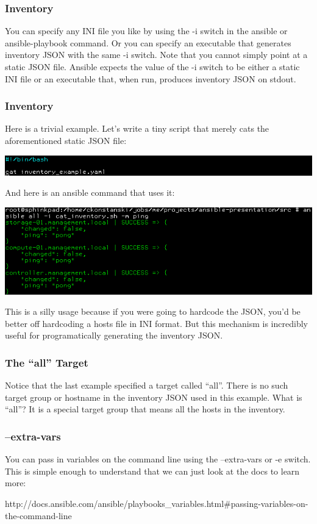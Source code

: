 \documentclass[helvetica,english,utf8,notitle,nologo]{beamer}
\begin{document}
\begin{frame}
  \frametitle{Inventory}

  You can specify any INI file you like by using the -i switch in the
  ansible or ansible-playbook command. Or you can specify an
  executable that generates inventory JSON with the same -i
  switch. Note that you cannot simply point at a static JSON
  file. Ansible expects the value of the -i switch to be either a
  static INI file or an executable that, when run, produces inventory
  JSON on stdout.
\end{frame}

\begin{frame}
  \frametitle{Inventory}

  Here is a trivial example. Let's write a tiny script that merely
  cats the aforementioned static JSON file:

  \includegraphics[scale=0.44]{img_10}

  And here is an ansible command that uses it:

  \includegraphics[scale=0.44]{img_11}

  This is a silly usage because if you were going to hardcode the
  JSON, you'd be better off hardcoding a hosts file in INI format. But
  this mechanism is incredibly useful for programatically generating
  the inventory JSON.
\end{frame}

\begin{frame}
  \frametitle{The ``all'' Target}

  Notice that the last example specified a target called
  ``all''. There is no such target group or hostname in the inventory
  JSON used in this example. What is ``all''? It is a special target
  group that means all the hosts in the inventory.
\end{frame}

\begin{frame}
  \frametitle{--extra-vars}

  You can pass in variables on the command line using the --extra-vars
  or -e switch. This is simple enough to understand that we can just
  look at the docs to learn more:

  http://docs.ansible.com/ansible/playbooks\_variables.html\#passing-variables-on-the-command-line
\end{frame}
\end{document}
